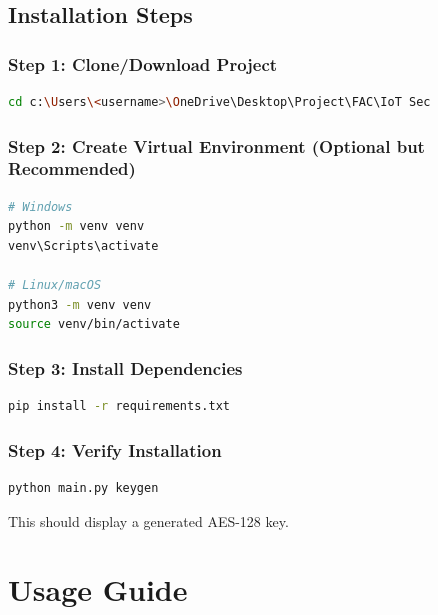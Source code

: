 \documentclass[12pt,a4paper]{report}
\begin{document}
\section{Installation Steps}

\subsection{Step 1: Clone/Download Project}

\begin{lstlisting}[language=bash]
cd c:\Users\<username>\OneDrive\Desktop\Project\FAC\IoT Sec
\end{lstlisting}

\subsection{Step 2: Create Virtual Environment (Optional but Recommended)}

\begin{lstlisting}[language=bash]
# Windows
python -m venv venv
venv\Scripts\activate

# Linux/macOS
python3 -m venv venv
source venv/bin/activate
\end{lstlisting}

\subsection{Step 3: Install Dependencies}

\begin{lstlisting}[language=bash]
pip install -r requirements.txt
\end{lstlisting}

\subsection{Step 4: Verify Installation}

\begin{lstlisting}[language=bash]
python main.py keygen
\end{lstlisting}

This should display a generated AES-128 key.

\chapter{Usage Guide}
\end{document}
